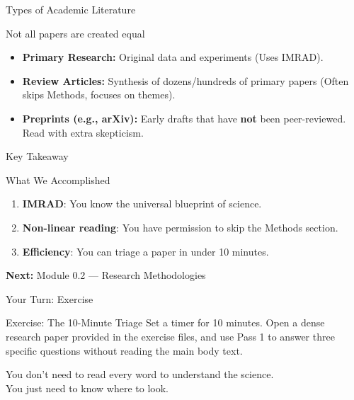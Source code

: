 \documentclass[aspectratio=169]{beamer}
\begin{document}
\begin{frame}{Types of Academic Literature}
  \begin{block}{Not all papers are created equal}
    \begin{itemize}
      \item \textbf{Primary Research:} Original data and experiments (Uses IMRAD).
      \item \textbf{Review Articles:} Synthesis of dozens/hundreds of primary papers (Often skips Methods, focuses on themes).
      \item \textbf{Preprints (e.g., arXiv):} Early drafts that have \textbf{not} been peer-reviewed. Read with extra skepticism.
    \end{itemize}
  \end{block}
\end{frame}

\begin{frame}{Key Takeaway}
  \begin{block}{What We Accomplished}
    \begin{enumerate}
      \item \textbf{IMRAD}: You know the universal blueprint of science.
      \item \textbf{Non-linear reading}: You have permission to skip the Methods section.
      \item \textbf{Efficiency}: You can triage a paper in under 10 minutes.
    \end{enumerate}
  \end{block}
  \vspace{0.3cm}
  \textbf{Next:} Module 0.2 --- Research Methodologies
\end{frame}

\begin{frame}{Your Turn: Exercise}
  \begin{exampleblock}{Exercise: The 10-Minute Triage}
    Set a timer for 10 minutes. Open a dense research paper provided in the exercise files, and use Pass 1 to answer three specific questions without reading the main body text.
  \end{exampleblock}
\end{frame}

\begin{frame}[standout]
  You don't need to read every word to understand the science.\\
  You just need to know where to look.
\end{frame}
\end{document}
